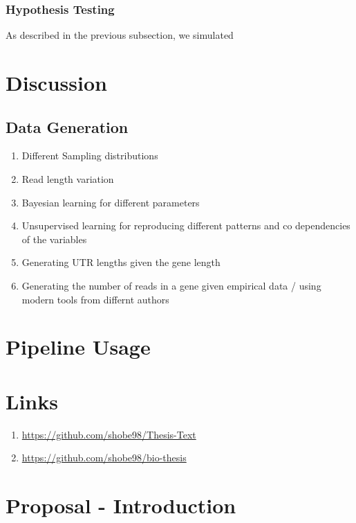 \documentclass[12pt]{article}
\begin{document}
\subsubsection{Hypothesis Testing}

As described in the previous subsection, we simulated 

\section{Discussion}\label{disc}
\subsection{Data Generation}
\begin{enumerate}
    \item Different Sampling distributions 
    \item Read length variation 
    \item Bayesian learning for different parameters
    \item Unsupervised learning for reproducing different patterns and co dependencies of the variables
    \item Generating UTR lengths given the gene length
    \item Generating the number of reads in a gene given empirical data / using modern tools from differnt authors
\end{enumerate}

\section{Pipeline Usage}

\section{Links}
\begin{enumerate}
    \item  \url{https://github.com/shobe98/Thesis-Text}
\item \url{https://github.com/shobe98/bio-thesis}

\end{enumerate}


\section{Proposal - Introduction}
\end{document}
